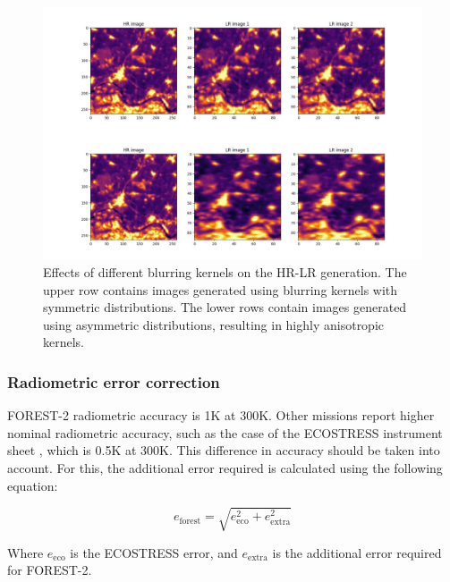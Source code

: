         \begin{figure}[H]
                \centering
                \includegraphics[width=\linewidth]{Includes/4-degradation-kernel-examples.pdf}
                \caption{Effects of different blurring kernels on the HR-LR generation. The upper row contains images generated using blurring kernels with symmetric distributions. The lower rows contain images generated using asymmetric distributions, resulting in highly anisotropic kernels.}
                \label{fig:4-degradation-kernel-examples}
            \end{figure}
            
        \subsubsection{Radiometric error correction}

        FOREST-2 radiometric accuracy is 1K at 300K.
        Other missions report higher nominal radiometric accuracy, such as the case of the ECOSTRESS instrument sheet \cite{ECOSTRESS2023INSTRUMENT}, which is 0.5K at 300K.
        This difference in accuracy should be taken into account. For this, the additional error required is calculated using the following equation:

        \begin{equation}
            e_{\text{forest}} = \sqrt{e_{\text{eco}}^2 + e_{\text{extra}}^2} 
            \label{eq:4-radiometric-error-correction}
        \end{equation}
        
        Where $e_{\text{eco}}$ is the ECOSTRESS error, and $ e_{\text{extra}}$ is the additional error required for FOREST-2.
        
